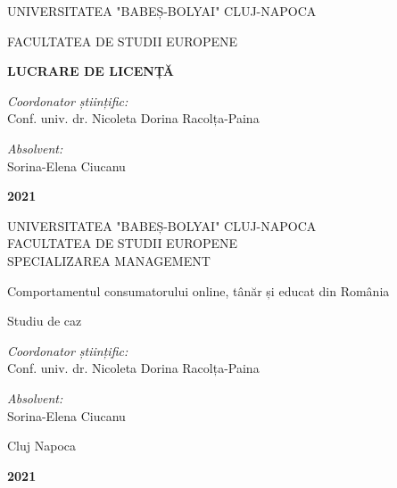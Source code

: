 \documentclass[a4paper, 12pt]{article}
\begin{document}
\begin{titlepage}
	\begin{center}
		\vspace{0.5cm}
		\large {UNIVERSITATEA "BABEȘ-BOLYAI" CLUJ-NAPOCA}
		
		\large {FACULTATEA DE STUDII EUROPENE}
		\\
		
		
		\vspace{6cm}
		
		\Huge \textbf{LUCRARE DE LICENȚĂ}
		
		\vspace{2 cm}
		
		\vfill
	\end{center}
	
	\begin{flushleft}
		\large{\textit{Coordonator științific:}} \\
		\large{Conf. univ. dr. Nicoleta Dorina Racolța-Paina}
	\end{flushleft}
	
	\begin{flushright}
		\hfill \large {\textit{Absolvent:}} \\
		\hfill \large {Sorina-Elena Ciucanu}
	\end{flushright}
	
	\begin{center}
		\vspace{1.5cm}
		\large \textbf{2021}
	\end{center}
\end{titlepage}
\begin{titlepage}
	\begin{center}
		\vspace{0.5cm}
		\large {UNIVERSITATEA "BABEȘ-BOLYAI" CLUJ-NAPOCA}
		\\
		\large {FACULTATEA DE STUDII EUROPENE}
		\\\large {SPECIALIZAREA MANAGEMENT}
		
		\vspace{2.75cm}
		
	
		\huge Comportamentul consumatorului online, tânăr și educat din România
		
		\huge Studiu de caz
		\vspace{1.5 cm}
		
		\vfill
	\end{center}
	
	\begin{flushleft}
		\large{\textit{Coordonator științific:}} \\
		\large{Conf. univ. dr. Nicoleta Dorina Racolța-Paina}
	\end{flushleft}
	
	\begin{flushright}
		\hfill \large {\textit{Absolvent:}} \\
		\hfill \large {Sorina-Elena Ciucanu}
	\end{flushright}
	
	\begin{center}
		\vspace{1.5cm}
		\Large{Cluj Napoca}
		
		\large \textbf{2021}
	\end{center}
\end{titlepage}
\end{document}
